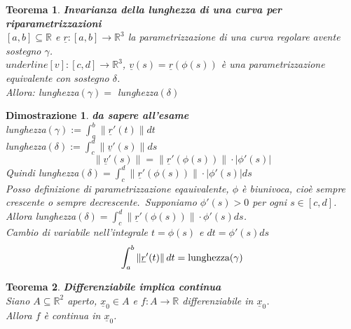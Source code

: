 \documentclass[10pt,landscape, a4paper]{article}
\newtheorem{teorema}{Teorema}
\newenvironment{thm}{\begin{mdframed}[backgroundcolor=white]\begin{teorema}}{\end{teorema}\end{mdframed}}
\newtheorem{demnstrn}{Dimostrazione}
\newenvironment{dimostrazione}{\begin{mdframed}[backgroundcolor=white]\begin{demnstrn}}{\end{demnstrn}\end{mdframed}}
\begin{document}
\begin{multicols}{3}
\begin{thm} 
\textbf{Invarianza della lunghezza di una curva per riparametrizzazioni}\\
	$[a,b] \subseteq \mathbb{R}$ e $\underline{r}: [a,b] \rightarrow \mathbb{R}^3$ la parametrizzazione di una curva regolare avente sostegno $\gamma$.\\
	$underline[v]: [c,d] \rightarrow \mathbb{R}^3$, $\underline{v}(s) = \underline{r}(\phi(s))$ è una parametrizzazione equivalente con sostegno $\delta$.\\
	Allora: lunghezza$(\gamma) =$ lunghezza$(\delta)$
\end{thm}
\begin{dimostrazione}
	\emph{\textbf{da sapere all'esame}}\\
	lunghezza$(\gamma) := \int_a^b \left\lVert \underline{r}'(t) \right\rVert dt$\\
	lunghezza$(\delta) := \int_c^d \left\lVert \underline{v}'(s) \right\rVert ds$\\
	\begin{equation}
		\left\lVert\underline{v}'(s)\right\rVert = \left\lVert \underline{r}'(\phi(s))\right\rVert  \cdot \left\lvert \phi'(s)\right\rvert 
	\end{equation}
	Quindi lunghezza$(\delta) = \int_c^d \left\lVert \underline{r}'(\phi(s))\right\rVert  \cdot \left\lvert \phi'(s)\right\rvert ds$\\
	Posso definizione di parametrizzazione eqauivalente, $\phi$ è biunivoca, cioè sempre crescente o sempre decrescente.\
	Supponiamo $\phi'(s) > 0$ per ogni $s \in [c,d]$.\\
	Allora lunghezza$(\delta) = \int_c^d \left\lVert \underline{r}'(\phi(s))\right\rVert  \cdot \phi'(s) ds$.\\
	Cambio di variabile nell'integrale $t=\phi(s)$ e $dt = \phi'(s) ds$\\
	\begin{equation}
		\int_a^b \left\lVert \underline{r}'(t) \right\rVert dt = \textnormal{lunghezza}(\gamma)
	\end{equation}
\end{dimostrazione}



\begin{thm} \textbf{Differenziabile implica continua}\\
	Siano $A \subseteq \mathbb{R}^2$ aperto, $\underline{x}_0 \in A$ e $f: A \to \mathbb{R}$ differenziabile in $\underline{x}_0$.\\
	Allora $f$ è continua in $\underline{x}_0$.
\end{thm}


\end{multicols}
\end{document}
